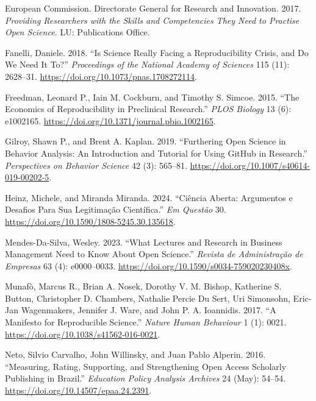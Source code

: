 \documentclass[
  a4paper,
]{article}
\newlength{\cslhangindent}
\newenvironment{CSLReferences}[2] %
 {\begin{list}{}{%
  \setlength{\itemindent}{0pt}
  \setlength{\leftmargin}{0pt}
  \setlength{\parsep}{0pt}
  \ifodd #1
   \setlength{\leftmargin}{\cslhangindent}
   \setlength{\itemindent}{-1\cslhangindent}
  \fi
  \setlength{\itemsep}{#2\baselineskip}}}
 {\end{list}}
\begin{document}
\begin{CSLReferences}{1}{0}
European Commission. Directorate General for Research and Innovation.
2017. \emph{Providing {Researchers} with the {Skills} and {Competencies
They Need} to {Practise Open Science}.} LU: Publications Office.

Fanelli, Daniele. 2018. {``Is {Science Really Facing} a {Reproducibility
Crisis}, and {Do We Need It To}?''} \emph{Proceedings of the National
Academy of Sciences} 115 (11): 2628--31.
\url{https://doi.org/10.1073/pnas.1708272114}.

Freedman, Leonard P., Iain M. Cockburn, and Timothy S. Simcoe. 2015.
{``The {Economics} of {Reproducibility} in {Preclinical Research}.''}
\emph{PLOS Biology} 13 (6): e1002165.
\url{https://doi.org/10.1371/journal.pbio.1002165}.

Gilroy, Shawn P., and Brent A. Kaplan. 2019. {``Furthering {Open
Science} in {Behavior Analysis}: {An Introduction} and {Tutorial} for
{Using GitHub} in {Research}.''} \emph{Perspectives on Behavior Science}
42 (3): 565--81. \url{https://doi.org/10.1007/s40614-019-00202-5}.

Heinz, Michele, and Miranda Miranda. 2024. {``Ci{ê}ncia {Aberta}:
{Argumentos} e {Desafios Para Sua Legitima{ç}{ã}o Cient{í}fica}.''}
\emph{Em Quest{ã}o} 30.
\url{https://doi.org/10.1590/1808-5245.30.135618}.

Mendes-Da-Silva, Wesley. 2023. {``What {Lectures} and {Research} in
{Business Management Need} to {Know About Open Science}.''}
\emph{Revista de Administra{ç}{ã}o de Empresas} 63 (4): e0000--0033.
\url{https://doi.org/10.1590/s0034-759020230408x}.

Munafò, Marcus R., Brian A. Nosek, Dorothy V. M. Bishop, Katherine S.
Button, Christopher D. Chambers, Nathalie Percie Du Sert, Uri Simonsohn,
Eric-Jan Wagenmakers, Jennifer J. Ware, and John P. A. Ioannidis. 2017.
{``A {Manifesto} for {Reproducible Science}.''} \emph{Nature Human
Behaviour} 1 (1): 0021. \url{https://doi.org/10.1038/s41562-016-0021}.

Neto, Silvio Carvalho, John Willinsky, and Juan Pablo Alperin. 2016.
{``Measuring, {Rating}, {Supporting}, and {Strengthening Open Access
Scholarly Publishing} in {Brazil}.''} \emph{Education Policy Analysis
Archives} 24 (May): 54--54. \url{https://doi.org/10.14507/epaa.24.2391}.


\end{CSLReferences}
\end{document}
